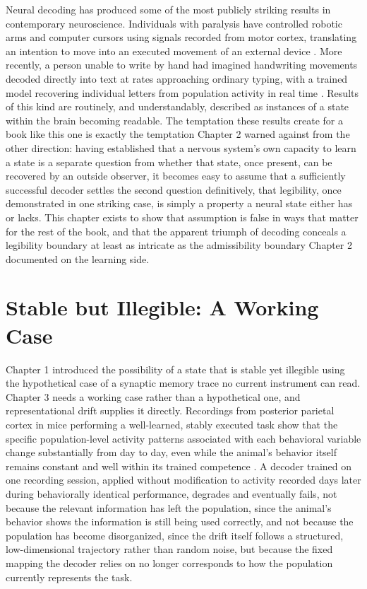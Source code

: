 \documentclass[11pt]{book}
\begin{document}
Neural decoding has produced some of the most publicly striking results in contemporary neuroscience. Individuals with paralysis have controlled robotic arms and computer cursors using signals recorded from motor cortex, translating an intention to move into an executed movement of an external device \cite{hochberg2006}. More recently, a person unable to write by hand had imagined handwriting movements decoded directly into text at rates approaching ordinary typing, with a trained model recovering individual letters from population activity in real time \cite{willett2021}. Results of this kind are routinely, and understandably, described as instances of a state within the brain becoming readable. The temptation these results create for a book like this one is exactly the temptation Chapter 2 warned against from the other direction: having established that a nervous system's own capacity to learn a state is a separate question from whether that state, once present, can be recovered by an outside observer, it becomes easy to assume that a sufficiently successful decoder settles the second question definitively, that legibility, once demonstrated in one striking case, is simply a property a neural state either has or lacks. This chapter exists to show that assumption is false in ways that matter for the rest of the book, and that the apparent triumph of decoding conceals a legibility boundary at least as intricate as the admissibility boundary Chapter 2 documented on the learning side.

\section{Stable but Illegible: A Working Case}

Chapter 1 introduced the possibility of a state that is stable yet illegible using the hypothetical case of a synaptic memory trace no current instrument can read. Chapter 3 needs a working case rather than a hypothetical one, and representational drift supplies it directly. Recordings from posterior parietal cortex in mice performing a well-learned, stably executed task show that the specific population-level activity patterns associated with each behavioral variable change substantially from day to day, even while the animal's behavior itself remains constant and well within its trained competence \cite{driscoll2017}. A decoder trained on one recording session, applied without modification to activity recorded days later during behaviorally identical performance, degrades and eventually fails, not because the relevant information has left the population, since the animal's behavior shows the information is still being used correctly, and not because the population has become disorganized, since the drift itself follows a structured, low-dimensional trajectory rather than random noise, but because the fixed mapping the decoder relies on no longer corresponds to how the population currently represents the task.
\end{document}
